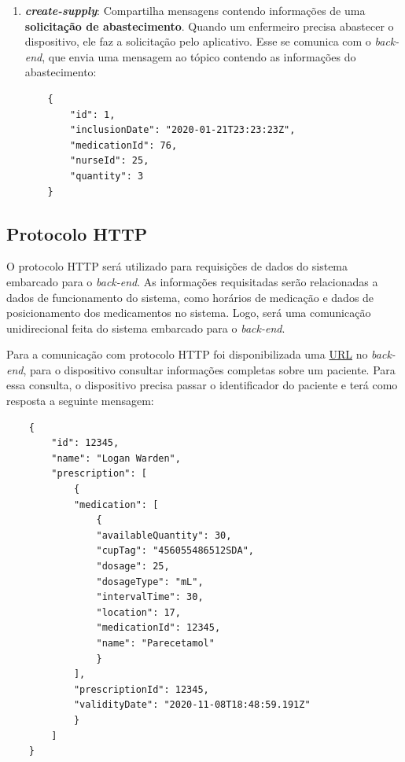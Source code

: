 \begin{enumerate}
    \item \textbf{\textit{create-supply}}: Compartilha mensagens contendo informações de uma \textbf{solicitação de abastecimento}. Quando um enfermeiro precisa abastecer o dispositivo, ele faz a solicitação pelo aplicativo. Esse se comunica com o \textit{back-end}, que envia uma mensagem ao tópico contendo as informações do abastecimento:
    
        \begin{verbatim}
    {
        "id": 1,
        "inclusionDate": "2020-01-21T23:23:23Z",
        "medicationId": 76,
        "nurseId": 25,
        "quantity": 3
    }
    \end{verbatim}
\end{enumerate}

\subsection{Protocolo HTTP}

O protocolo HTTP será utilizado para requisições de dados do sistema embarcado para o \textit{back-end}. As informações requisitadas serão relacionadas a dados de funcionamento do sistema, como horários de medicação e dados de posicionamento dos medicamentos no sistema. Logo, será uma comunicação unidirecional feita do sistema embarcado para o \textit{back-end}.

Para a comunicação com protocolo HTTP foi disponibilizada uma \href{http://192.99.25.198:8082/swagger-ui.html#/Patient/getPatientDetails}{URL} no \textit{back-end}, para o dispositivo consultar informações completas sobre um paciente. Para essa consulta, o dispositivo precisa passar o identificador do paciente e terá como resposta a seguinte mensagem:

        \begin{verbatim}
    {
        "id": 12345,
        "name": "Logan Warden",
        "prescription": [
            {
            "medication": [
                {
                "availableQuantity": 30,
                "cupTag": "456055486512SDA",
                "dosage": 25,
                "dosageType": "mL",
                "intervalTime": 30,
                "location": 17,
                "medicationId": 12345,
                "name": "Parecetamol"
                }
            ],
            "prescriptionId": 12345,
            "validityDate": "2020-11-08T18:48:59.191Z"
            }
        ]
    }
    \end{verbatim}